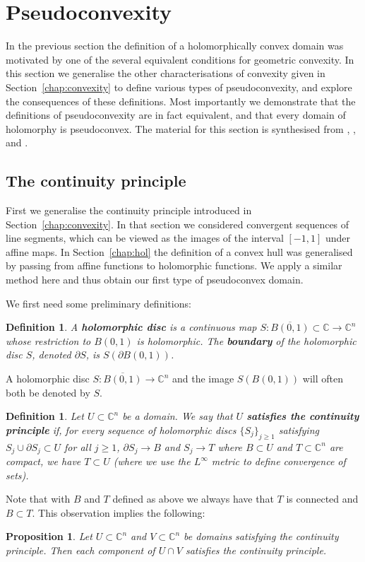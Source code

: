 \documentclass[11pt,a4paper, final, twoside]{article}
\newtheorem{definition}[theorem]{Definition}
\newtheorem{proposition}[theorem]{Proposition}
\numberwithin{equation}{section}
\newcommand{\C}{\mathbb C}
\newcommand{\clos}[1]{\overline{#1}}
\newcommand{\bd}{\partial}
\newcommand{\ball}{B}
\begin{document}
\section{Pseudoconvexity}
\label{chap:pseudo}
In the previous section the definition of a holomorphically convex domain was motivated by one of the several equivalent conditions for geometric convexity. In this section we generalise the other
characterisations of convexity given in Section~\ref{chap:convexity} to define various types of pseudoconvexity, and explore the consequences of these definitions.
Most importantly we demonstrate that the definitions of pseudoconvexity are in fact equivalent, and that every domain of holomorphy is pseudoconvex. The material for this section is synthesised from 
\cite{boas}, \cite{range}, \cite{itca} and \cite{vlad}.
\subsection{The continuity principle}
First we generalise the continuity principle introduced in Section~\ref{chap:convexity}. In that section we considered convergent sequences of line segments,
which can be viewed as the images of the interval $[-1,1]$ under affine maps. In Section~\ref{chap:hol} the definition of a convex hull was generalised by passing from affine functions to holomorphic
functions. We apply a similar method here and thus obtain our first type of pseudoconvex domain.

We first need some preliminary definitions:
\begin{definition}
A \textbf{holomorphic disc} is a continuous map $S\colon\clos{\ball(0,1)}\subset\C\to\C^n$ whose restriction to $\ball(0,1)$ is holomorphic.
The \textbf{boundary} of the holomorphic disc $S$, denoted $\bd S$, is $S(\bd\ball(0,1))$. 
\end{definition}
A holomorphic disc $S\colon\clos{\ball(0,1)}\to\C^n$ and the image $S(\ball(0,1))$ will often both be denoted by $S$. 
\begin{definition}
Let $U\subset\C^n$ be a domain. 
We say that $U$ \textbf{satisfies the continuity principle} if, for every sequence of holomorphic discs $\{S_j\}_{j\geq 1}$ satisfying $S_j\cup\bd S_j\subset U$ for all $j\geq 1$,
$\bd S_j\to B$ and $S_j\to T$ where $B\subset U$ and $T\subset \C^n$ are compact, we have $T\subset U$ (where we use the $L^\infty$ metric to define convergence of sets). 
\end{definition}
Note that with $B$ and $T$ defined as above we always have that $T$ is connected and $B\subset T$. This observation implies the following:
\begin{proposition}
\label{ctyint}
Let $U\subset\C^n$ and $V\subset\C^n$ be domains satisfying the continuity principle. Then each component of $U\cap V$ satisfies the continuity principle.
\end{proposition}
\end{document}
